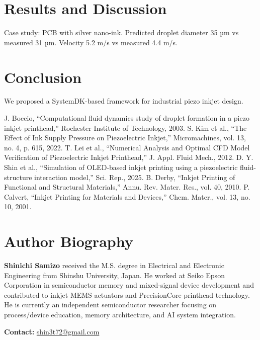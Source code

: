 \documentclass[conference]{IEEEtran}
\begin{document}
\section{Results and Discussion}
Case study: PCB with silver nano-ink.  
Predicted droplet diameter 35 µm vs measured 31 µm.  
Velocity 5.2 m/s vs measured 4.4 m/s.  

\section{Conclusion}
We proposed a SystemDK-based framework for industrial piezo inkjet design.  

\begin{thebibliography}{99}
 J. Boccio, ``Computational fluid dynamics study of droplet formation in a piezo inkjet printhead,'' Rochester Institute of Technology, 2003.
 S. Kim et al., ``The Effect of Ink Supply Pressure on Piezoelectric Inkjet,'' Micromachines, vol. 13, no. 4, p. 615, 2022.
 T. Lei et al., ``Numerical Analysis and Optimal CFD Model Verification of Piezoelectric Inkjet Printhead,'' J. Appl. Fluid Mech., 2012.
 D. Y. Shin et al., ``Simulation of OLED-based inkjet printing using a piezoelectric fluid-structure interaction model,'' Sci. Rep., 2025.
 B. Derby, ``Inkjet Printing of Functional and Structural Materials,'' Annu. Rev. Mater. Res., vol. 40, 2010.
 P. Calvert, ``Inkjet Printing for Materials and Devices,'' Chem. Mater., vol. 13, no. 10, 2001.
\end{thebibliography}

\section*{Author Biography}
\textbf{Shinichi Samizo} received the M.S. degree in Electrical and Electronic Engineering from Shinshu University, Japan. 
He worked at Seiko Epson Corporation in semiconductor memory and mixed-signal device development and contributed to inkjet MEMS actuators and PrecisionCore printhead technology. 
He is currently an independent semiconductor researcher focusing on process/device education, memory architecture, and AI system integration.  

\textbf{Contact:} \href{mailto:shin3t72@gmail.com}{shin3t72@gmail.com}
\end{document}
